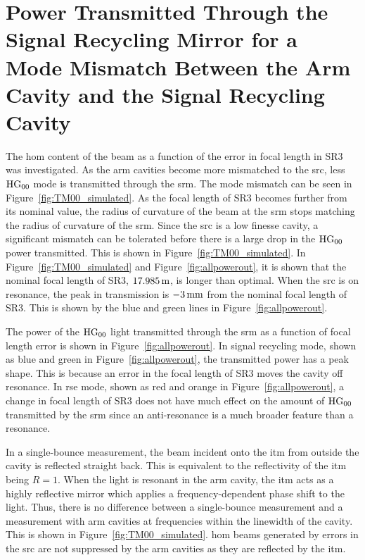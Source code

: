 \section{Power Transmitted Through the Signal Recycling Mirror for a Mode Mismatch Between the Arm Cavity and the Signal Recycling Cavity}
\label{sec:beam_parameter_chapter_HOM_simulation}
The \gls{hom} content of the beam as a function of the error in focal length in SR3 was investigated. As the arm cavities become more mismatched to the \gls{src}, less $\rm{HG}_{00}$ mode is transmitted through the \gls{srm}. The mode mismatch can be seen in Figure~\ref{fig:TM00_simulated}. As the focal length of SR3 becomes further from its nominal value, the radius of curvature of the beam at the \gls{srm} stops matching the radius of curvature of the \gls{srm}. Since the \gls{src} is a low finesse cavity, a significant mismatch can be tolerated before there is a large drop in the $\rm{HG}_{00}$ power transmitted. This is shown in Figure~\ref{fig:TM00_simulated}. In Figure~\ref{fig:TM00_simulated} and Figure~\ref{fig:allpowerout}, it is shown that the nominal focal length of SR3, $17.985\,\rm{m}$, is longer than optimal. When the \gls{src} is on resonance, the peak in transmission is $-3\,\rm{mm}$ from the nominal focal length of SR3. This is shown by the blue and green lines in Figure~\ref{fig:allpowerout}. 
\par
The power of the $\rm{HG}_{00}$ light transmitted through the \gls{srm} as a function of focal length error is shown in Figure~\ref{fig:allpowerout}. In signal recycling mode, shown as blue and green in Figure~\ref{fig:allpowerout}, the transmitted power has a peak shape. This is because an error in the focal length of SR3 moves the cavity off resonance. In \gls{rse} mode, shown as red and orange in Figure~\ref{fig:allpowerout}, a change in focal length of SR3 does not have much effect on the amount of $\rm{HG}_{00}$ transmitted by the \gls{srm} since an anti-resonance is a much broader feature than a resonance.
\par
In a single-bounce measurement, the beam incident onto the \gls{itm} from outside the cavity is reflected straight back. This is equivalent to the reflectivity of the \gls{itm} being $R = 1$. When the light is resonant in the arm cavity, the \gls{itm} acts as a highly reflective mirror which applies a frequency-dependent phase shift to the light. Thus, there is no difference between a single-bounce measurement and a measurement with arm cavities at frequencies within the linewidth of the cavity. This is shown in Figure~\ref{fig:TM00_simulated}. \gls{hom} beams generated by errors in the \gls{src} are not suppressed by the arm cavities as they are reflected by the \gls{itm}.
